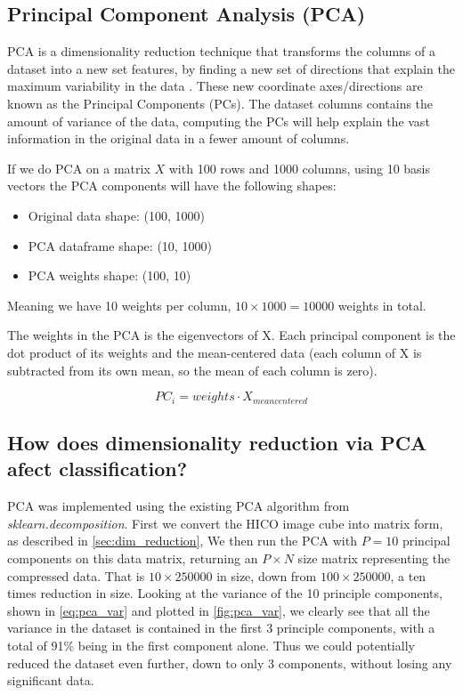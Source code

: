 \subsection{Principal Component Analysis (PCA)}

PCA is a dimensionality reduction technique that transforms the columns of a dataset 
into a new set features, by finding a new set of directions that explain the maximum 
variability in the data \cite{prabhakaran2019}. These new coordinate axes/directions 
are known as the Principal Components (PCs). The dataset columns contains the amount 
of variance of the data, computing the PCs will help explain the vast information in 
the original data in a fewer amount of columns. 

If we do PCA on a matrix $X$ with 100 rows and 1000 columns, using 10 basis vectors 
the PCA components will have the following shapes:

\begin{itemize}
    \item Original data shape:  (100, 1000)
    \item PCA dataframe shape:  (10, 1000)
    \item PCA weights shape:  (100, 10)
\end{itemize}

Meaning we have 10 weights per column, $10 \times 1000 = 10000$ weights in total. 

The weights in the PCA is the eigenvectors of X. Each principal component is the dot 
product of its weights and the mean-centered data (each column of X is subtracted from 
its own mean, so the mean of each column is zero). 

\begin{equation}
    PC_i = weights \cdot X_{meancentered}
\end{equation}


\subsection{How does dimensionality reduction via PCA afect classification?}

PCA was implemented using the existing PCA algorithm from \textit{sklearn.decomposition}. 
First we convert the HICO image cube into matrix form, as described in \cref{sec:dim_reduction}, 
We then run the PCA with $P = 10$ principal components on this data matrix, returning 
an $P \times N$ size matrix representing the compressed data. That is $10 \times 250000$ in size, 
down from $100 \times 250000$, a ten times reduction in size. Looking at the variance 
of the 10 principle components, shown in \cref{eq:pca_var} and plotted in \cref{fig:pca_var}, we 
clearly see that all the variance in the dataset is contained in the first 3 principle components, 
with a total of 91\% being in the first component alone. 
Thus we could potentially reduced the dataset even further, down to only 3 components, without 
losing any significant data. 

